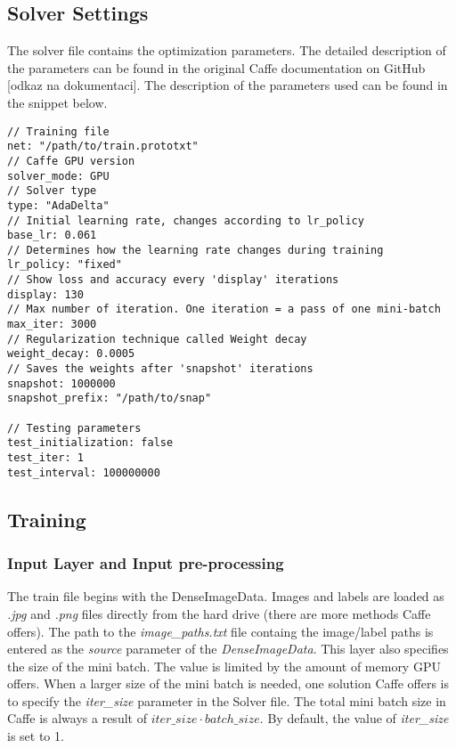\subsection{Solver Settings}

The solver file contains the optimization parameters. The detailed description of the parameters can be found in the original Caffe documentation on GitHub [odkaz na dokumentaci]. The description of the parameters used can be found in the snippet below. 

\begin{lstlisting}
// Training file
net: "/path/to/train.prototxt"	
// Caffe GPU version
solver_mode: GPU
// Solver type		
type: "AdaDelta"
// Initial learning rate, changes according to lr_policy		
base_lr: 0.061		
// Determines how the learning rate changes during training
lr_policy: "fixed"	
// Show loss and accuracy every 'display' iterations
display: 130
// Max number of iteration. One iteration = a pass of one mini-batch			
max_iter: 3000	
// Regularization technique called Weight decay		
weight_decay: 0.0005
// Saves the weights after 'snapshot' iterations
snapshot: 1000000		
snapshot_prefix: "/path/to/snap" 

// Testing parameters
test_initialization: false	
test_iter: 1
test_interval: 100000000
\end{lstlisting}

\subsection{Training}

\subsubsection{Input Layer and Input pre-processing}

The train file begins with the DenseImageData. Images and labels are loaded as \textit{.jpg} and \textit{.png} files directly from the hard drive (there are more methods Caffe offers). The path to the \textit{image\_paths.txt} file containg the image/label paths is entered as the \textit{source} parameter of the \textit{DenseImageData}. This layer also specifies the size of the mini batch. The value is limited by the amount of memory GPU offers. When a larger size of the mini batch is needed, one solution Caffe offers is to specify the \textit{iter\_size} parameter in the Solver file. The total mini batch size in Caffe is always a result of $iter\_size \cdot batch\_size$. By default, the value of \textit{iter\_size} is set to 1.

